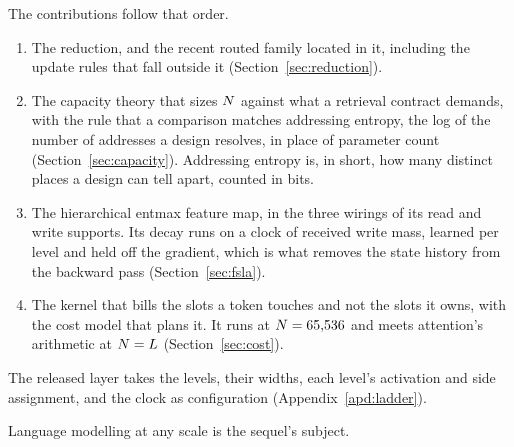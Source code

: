The contributions follow that order.
\begin{enumerate}\setlength{\itemsep}{1pt}\setlength{\parskip}{0pt}
\item The reduction, and the recent routed family located in it, including the update rules that fall outside it (Section~\ref{sec:reduction}).
\item The capacity theory that sizes $N$ against what a retrieval contract demands, with the rule that a comparison matches addressing entropy, the log of the number of addresses a design resolves, in place of parameter count (Section~\ref{sec:capacity}). Addressing entropy is, in short, how many distinct places a design can tell apart, counted in bits.
\item The hierarchical entmax feature map, in the three wirings of its read and write supports. Its decay runs on a clock of received write mass, learned per level and held off the gradient, which is what removes the state history from the backward pass (Section~\ref{sec:fsla}).
\item The kernel that bills the slots a token touches and not the slots it owns, with the cost model that plans it. It runs at $N = 65{,}536$ and meets attention's arithmetic at $N = L$ (Section~\ref{sec:cost}).
\end{enumerate}

The released layer takes the levels, their widths, each level's activation and side assignment, and the clock as configuration (Appendix~\ref{apd:ladder}).

Language modelling at any scale is the sequel's subject.
